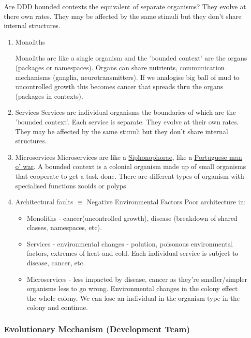 \documentclass[11pt]{article}
\begin{document}
Are DDD bounded contexts the equivalent of separate organisms? They evolve at there own rates. They may be affected by the same stimuli but they don't share internal structures.

\begin{enumerate}
\item Monoliths
\label{sec:org8a726a0}

Monoliths are like a single organism and the 'bounded context' are the organs (packages or namespaces). Organs can share nutrients, communication mechanisms (ganglia, neurotransmitters).
If we analogise big ball of mud to uncontrolled growth this becomes cancer that spreads thru the organs (packages in contexts).

\item Services
\label{sec:orgd0f4e10}
Services are individual organisms the boundaries of which are the 'bounded context'. Each service is separate. They evolve at their own rates. They may be affected by the same stimuli but they don't share internal structures.

\item Microservices
\label{sec:orgd09aa1c}
Microservices are like a \href{https://en.wikipedia.org/wiki/Siphonophorae}{Siphonophorae}, like a \href{https://en.wikipedia.org/wiki/Portuguese\_man\_o\%2527\_war}{Portuguese man o' war}. A bounded context is a colonial organism made up of small organisms that cooperate to get a task done. There are different types of organism with specialised functions zooids or polyps

\item Architectural faults \(\equiv\) Negative Environmental Factors
\label{sec:org9714fed}
Poor architecture in:
\begin{itemize}
\item Monoliths - cancer(uncontrolled growth), disease (breakdown of shared classes, namespaces, etc).
\item Services - environmental changes - polution, poisonous environmental factors, extremes of heat and cold. Each individual service is subject to disease, cancer, etc.
\item Microservices - less impacted by disease, cancer as they're smaller/simpler organisms less to go wrong. Environmental changes in the colony effect the whole colony. We can lose an individual in the organism type in the colony and continue.
\end{itemize}
\end{enumerate}


\subsubsection{Evolutionary Mechanism (Development Team)}
\label{sec:org538bfab}
\end{document}
